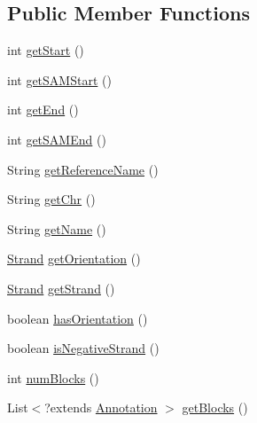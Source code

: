 \subsection*{Public Member Functions}
\begin{DoxyCompactItemize}
\item 
int \hyperlink{interfaceumms_1_1core_1_1annotation_1_1_annotation_a4fc0345d5a95dfb0bfd018cc0d9d400f}{get\+Start} ()
\item 
int \hyperlink{interfaceumms_1_1core_1_1annotation_1_1_annotation_a26f021a7fa89d0cfd22f2ff2b7801388}{get\+S\+A\+M\+Start} ()
\item 
int \hyperlink{interfaceumms_1_1core_1_1annotation_1_1_annotation_a51310d48912558d549d21cbf92ab946a}{get\+End} ()
\item 
int \hyperlink{interfaceumms_1_1core_1_1annotation_1_1_annotation_ad3de070378091d8ae6cad2d496abba22}{get\+S\+A\+M\+End} ()
\item 
String \hyperlink{interfaceumms_1_1core_1_1annotation_1_1_annotation_a2dd53f6e6ab4a573c0e93ef42e223b93}{get\+Reference\+Name} ()
\item 
String \hyperlink{interfaceumms_1_1core_1_1annotation_1_1_annotation_ab07edf07fd2182cd16bceb91ee6de35a}{get\+Chr} ()
\item 
String \hyperlink{interfaceumms_1_1core_1_1annotation_1_1_annotation_adf055d923b7239351f4dd5908a1eebeb}{get\+Name} ()
\item 
\hyperlink{enumumms_1_1core_1_1annotation_1_1_annotation_1_1_strand}{Strand} \hyperlink{interfaceumms_1_1core_1_1annotation_1_1_annotation_ad5125f9609856d2a1b8e788664551558}{get\+Orientation} ()
\item 
\hyperlink{enumumms_1_1core_1_1annotation_1_1_annotation_1_1_strand}{Strand} \hyperlink{interfaceumms_1_1core_1_1annotation_1_1_annotation_ae43b57d64e5ca6c58123c695fa31bf34}{get\+Strand} ()
\item 
boolean \hyperlink{interfaceumms_1_1core_1_1annotation_1_1_annotation_aa8997ebac18d2e6317446d322024023a}{has\+Orientation} ()
\item 
boolean \hyperlink{interfaceumms_1_1core_1_1annotation_1_1_annotation_aa72d3cd6ea67627915291f116b777be3}{is\+Negative\+Strand} ()
\item 
int \hyperlink{interfaceumms_1_1core_1_1annotation_1_1_annotation_a2b259de4e354584df8ecd4c1b3db0c66}{num\+Blocks} ()
\item 
List$<$?extends \hyperlink{interfaceumms_1_1core_1_1annotation_1_1_annotation}{Annotation} $>$ \hyperlink{interfaceumms_1_1core_1_1annotation_1_1_annotation_a1fc089c9a77adad8c174d36bf2452489}{get\+Blocks} ()

\end{DoxyCompactItemize}
